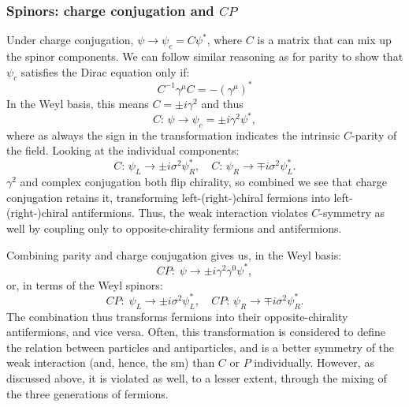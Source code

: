 \subsubsection{Spinors: charge conjugation and $CP$}

Under charge conjugation, $\psi \rightarrow \psi_c = C\psi^*$, where $C$ is a matrix that can mix up the spinor components.
We can follow similar reasoning as for parity to show that $\psi_c$ satisfies the Dirac equation only if:
\begin{equation}
	\label{eq:01_qft_spinors_cpt_charge_operator}
	C^{-1}\gamma^\mu C = -(\gamma^\mu)^*
\end{equation}
In the Weyl basis, this means $C = \pm i \gamma^2$ and thus
\begin{equation}
	\label{eq:01_qft_spinors_cpt_charge_conjugation}
	C\mathrm{:\,} \psi \rightarrow \psi_c = \pm i\gamma^2\psi^*,
\end{equation}
where as always the sign in the transformation indicates the intrinsic $C$-parity of the field.
Looking at the individual components:
\begin{equation}
	\label{eq:01_qft_spinors_cpt_charge_conjugation_weyl}
	C\mathrm{:\,} \psi_L \rightarrow \pm i\sigma^2\psi_R^*, \quad C\mathrm{:\,} \psi_R \rightarrow \mp i\sigma^2\psi_L^*.
\end{equation}
$\gamma^2$ and complex conjugation both flip chirality, so combined we see that charge conjugation retains it, transforming left-(right-)chiral fermions into left-(right-)chiral antifermions.
Thus, the weak interaction violates $C$-symmetry as well by coupling only to opposite-chirality fermions and antifermions.

Combining parity and charge conjugation gives us, in the Weyl basis:
\begin{equation}
	\label{eq:01_qft_spinors_cpt_cp}
	CP\mathrm{:\;} \psi \rightarrow \pm i \gamma^2\gamma^0\psi^*,
\end{equation}
or, in terms of the Weyl spinors:
\begin{equation}
	\label{eq:01_qft_spinors_cpt_cp_weyl}
	CP\mathrm{:\;} \psi_L \rightarrow \pm i\sigma^2\psi_L^*, \quad CP\mathrm{:\,} \psi_R \rightarrow \mp i\sigma^2\psi_R^*.
\end{equation}
The combination thus transforms fermions into their opposite-chirality antifermions, and vice versa.
Often, this transformation is considered to define the relation between particles and antiparticles, and is a better symmetry of the weak interaction (and, hence, the sm) than $C$ or $P$ individually.
However, as discussed above, it is violated as well, to a lesser extent, through the mixing of the three generations of fermions.


